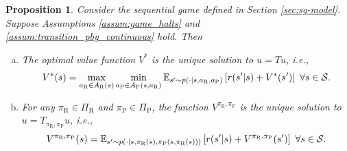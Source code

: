 \documentclass[11pt]{article}
\newtheorem{proposition}{Proposition}
\begin{document}
       \begin{proposition}
           \label{lem:bellman_equations}
           Consider the sequential game defined in Section \ref{sec:sg-model}. Suppose Assumptions \ref{assum:game_halts} and \ref{assum:transition_pby_continuous} hold. Then
           \begin{enumerate}[(a)]
               \item The optimal value function $V^*$ is the unique solution to $u = Tu$, i.e., 
           \begingroup
           \allowdisplaybreaks
           \begin{equation}
               \label{eqn:bellman_equation}
               V^*(s) = \max_{a_\text{R} \in A_\text{R}(s)}\min_{a_\text{P} \in A_\text{P}(s,a_\text{R})}\mathbb{E}_{s' \sim p(\cdot|s,a_\text{R},a_\text{P})}\left[r(s'|s) + V^*(s')\right] \ \forall s \in {\cal S}.
           \end{equation}
           \endgroup
           \item For any $\pi_\text{R} \in \Pi_\text{R}$ and $\pi_\text{P} \in \Pi_\text{P}$, the function $V^{\pi_\text{R},\pi_\text{P}}$ is the unique solution to $u = T_{\pi_\text{R},\pi_\text{P}}u$, i.e., 
           \begingroup
           \allowdisplaybreaks
           \begin{equation}
           \label{eqn:bellman_eval}
               V^{\pi_\text{R},\pi_\text{P}}(s) =   \mathbb{E}_{s' \sim p(\cdot|s,\pi_\text{R}(s),\pi_\text{P}(s,\pi_\text{R}(s)))}\left[r(s'|s) + V^{\pi_\text{R},\pi_\text{P}}(s')\right] \ \forall s \in {\cal S}.          
           \end{equation}
           \endgroup
           \end{enumerate}
       \end{proposition}
\end{document}
